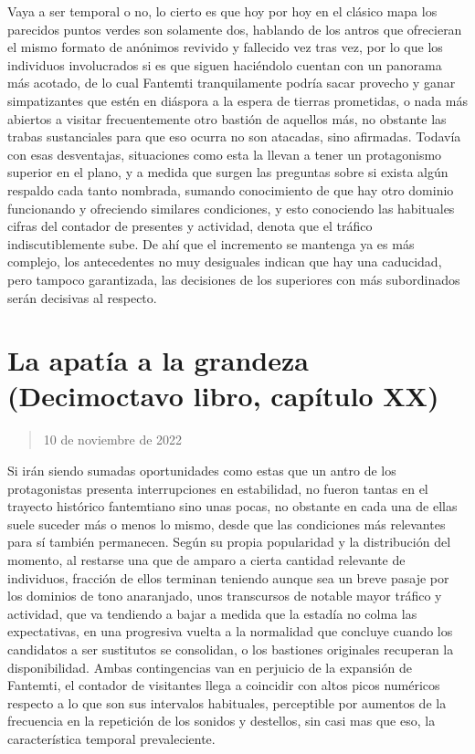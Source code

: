 \documentclass[
]{book}
\begin{document}
Vaya a ser temporal o no, lo cierto es que hoy por hoy en el clásico mapa los parecidos puntos verdes son solamente dos, hablando de los antros que ofrecieran el mismo formato de anónimos revivido y fallecido vez tras vez, por lo que los individuos involucrados si es que siguen haciéndolo cuentan con un panorama más acotado, de lo cual Fantemti tranquilamente podría sacar provecho y ganar simpatizantes que estén en diáspora a la espera de tierras prometidas, o nada más abiertos a visitar frecuentemente otro bastión de aquellos más, no obstante las trabas sustanciales para que eso ocurra no son atacadas, sino afirmadas. Todavía con esas desventajas, situaciones como esta la llevan a tener un protagonismo superior en el plano, y a medida que surgen las preguntas sobre si exista algún respaldo cada tanto nombrada, sumando conocimiento de que hay otro dominio funcionando y ofreciendo similares condiciones, y esto conociendo las habituales cifras del contador de presentes y actividad, denota que el tráfico indiscutiblemente sube. De ahí que el incremento se mantenga ya es más complejo, los antecedentes no muy desiguales indican que hay una caducidad, pero tampoco garantizada, las decisiones de los superiores con más subordinados serán decisivas al respecto.

\hypertarget{la-apatuxeda-a-la-grandeza-decimoctavo-libro-capuxedtulo-xx}{%
\section{La apatía a la grandeza (Decimoctavo libro, capítulo XX)}\label{la-apatuxeda-a-la-grandeza-decimoctavo-libro-capuxedtulo-xx}}

\begin{quote}
10 de noviembre de 2022
\end{quote}

Si irán siendo sumadas oportunidades como estas que un antro de los protagonistas presenta interrupciones en estabilidad, no fueron tantas en el trayecto histórico fantemtiano sino unas pocas, no obstante en cada una de ellas suele suceder más o menos lo mismo, desde que las condiciones más relevantes para sí también permanecen. Según su propia popularidad y la distribución del momento, al restarse una que de amparo a cierta cantidad relevante de individuos, fracción de ellos terminan teniendo aunque sea un breve pasaje por los dominios de tono anaranjado, unos transcursos de notable mayor tráfico y actividad, que va tendiendo a bajar a medida que la estadía no colma las expectativas, en una progresiva vuelta a la normalidad que concluye cuando los candidatos a ser sustitutos se consolidan, o los bastiones originales recuperan la disponibilidad. Ambas contingencias van en perjuicio de la expansión de Fantemti, el contador de visitantes llega a coincidir con altos picos numéricos respecto a lo que son sus intervalos habituales, perceptible por aumentos de la frecuencia en la repetición de los sonidos y destellos, sin casi mas que eso, la característica temporal prevaleciente.
\end{document}
